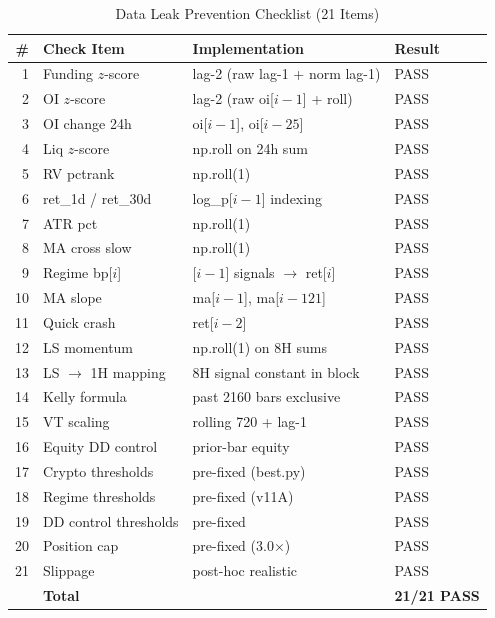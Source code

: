 \begin{table}[htbp]
\centering
\caption{Data Leak Prevention Checklist (21 Items)}
\label{tab:leak}
\small
\begin{tabular}{rlll}
\toprule
\# & Check Item & Implementation & Result \\
\midrule
1  & Funding $z$-score     & lag-2 (raw lag-1 + norm lag-1) & PASS \\
2  & OI $z$-score          & lag-2 (raw oi[$i{-}1$] + roll) & PASS \\
3  & OI change 24h         & oi[$i{-}1$], oi[$i{-}25$]      & PASS \\
4  & Liq $z$-score         & np.roll on 24h sum             & PASS \\
5  & RV pctrank            & np.roll(1)                     & PASS \\
6  & ret\_1d / ret\_30d    & log\_p[$i{-}1$] indexing       & PASS \\
7  & ATR pct               & np.roll(1)                     & PASS \\
8  & MA cross slow         & np.roll(1)                     & PASS \\
9  & Regime bp[$i$]        & [$i{-}1$] signals $\to$ ret[$i$] & PASS \\
10 & MA slope              & ma[$i{-}1$], ma[$i{-}121$]     & PASS \\
11 & Quick crash            & ret[$i{-}2$]                   & PASS \\
12 & LS momentum           & np.roll(1) on 8H sums          & PASS \\
13 & LS $\to$ 1H mapping   & 8H signal constant in block    & PASS \\
14 & Kelly formula          & past 2160 bars exclusive       & PASS \\
15 & VT scaling            & rolling 720 + lag-1             & PASS \\
16 & Equity DD control     & prior-bar equity                & PASS \\
17 & Crypto thresholds     & pre-fixed (best.py)             & PASS \\
18 & Regime thresholds     & pre-fixed (v11A)                & PASS \\
19 & DD control thresholds & pre-fixed                       & PASS \\
20 & Position cap          & pre-fixed (3.0$\times$)         & PASS \\
21 & Slippage              & post-hoc realistic              & PASS \\
\midrule
   & \textbf{Total}        &                                 & \textbf{21/21 PASS} \\
\bottomrule
\end{tabular}
\end{table}
